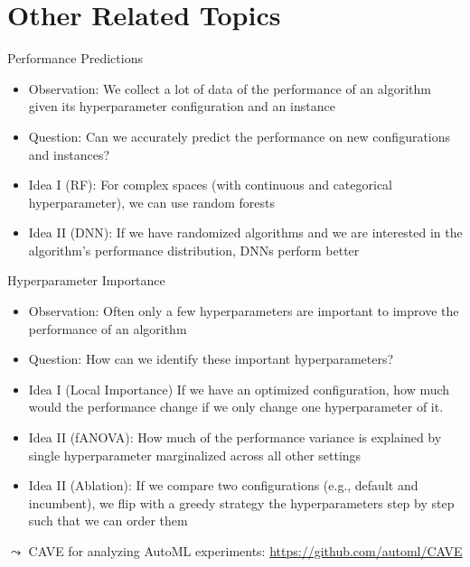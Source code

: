 \section{Other Related Topics}
\begin{frame}[c]{Performance Predictions}

\begin{itemize}
	\item \alert{Observation}: We collect a lot of data of the performance of an algorithm given its hyperparameter configuration and an instance
	\smallskip
	\pause
	\item \alert{Question}: Can we accurately predict the performance on new configurations and instances?
	\smallskip
	\pause
	\item \alert{Idea I (RF)}: For complex spaces (with continuous and categorical hyperparameter), we can use random forests  
	\smallskip
	\pause
	\item \alert{Idea II (DNN)}: If we have randomized algorithms and we are interested in the algorithm's performance distribution, DNNs perform better 
\end{itemize}

\end{frame}
\begin{frame}[c]{Hyperparameter Importance}

\begin{itemize}
	\item \alert{Observation}: Often only a few hyperparameters are important to improve the performance of an algorithm
	\smallskip
	\pause
	\item \alert{Question}: How can we identify these important hyperparameters?
	\smallskip
	\pause
	\item  \alert{Idea I (Local Importance)} If we have an optimized configuration, how much would the performance change if we only change one hyperparameter of it.
	\smallskip
	\pause
	\item \alert{Idea II (fANOVA)}: How much of the performance variance is explained by single hyperparameter marginalized across all other settings
	\smallskip
	\pause
	\item \alert{Idea II (Ablation)}: If we compare two configurations (e.g., default and incumbent), we flip with a greedy strategy the hyperparameters step by step such that we can order them
\end{itemize}

\pause
$\leadsto$ CAVE for analyzing AutoML experiments: \url{https://github.com/automl/CAVE}
\end{frame}
